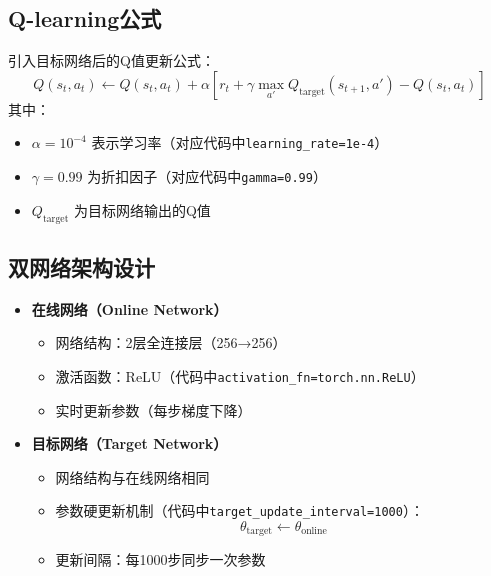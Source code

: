 \subsection{Q-learning公式}
引入目标网络后的Q值更新公式：
\[
Q(s_t,a_t) \leftarrow Q(s_t,a_t) + \alpha\left[r_t + \gamma \max_{a'}Q_{\text{target}}(s_{t+1},a') - Q(s_t,a_t)\right]
\]
其中：
\begin{itemize}
    \item $\alpha=10^{-4}$ 表示学习率（对应代码中\texttt{learning\_rate=1e-4}）
    \item $\gamma=0.99$ 为折扣因子（对应代码中\texttt{gamma=0.99}）
    \item $Q_{\text{target}}$ 为目标网络输出的Q值
\end{itemize}

\subsection{双网络架构设计}
\begin{itemize}
    \item \textbf{在线网络（Online Network）}
    \begin{itemize}
        \item 网络结构：2层全连接层（256→256）
        \item 激活函数：ReLU（代码中\texttt{activation\_fn=torch.nn.ReLU}）
        \item 实时更新参数（每步梯度下降）
    \end{itemize}
    
    \item \textbf{目标网络（Target Network）}
    \begin{itemize}
        \item 网络结构与在线网络相同
        \item 参数硬更新机制（代码中\texttt{target\_update\_interval=1000}）：
        \[
        \theta_{\text{target}} \leftarrow \theta_{\text{online}}
        \]
        \item 更新间隔：每1000步同步一次参数
    \end{itemize}
\end{itemize}

